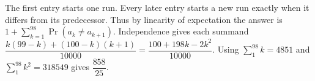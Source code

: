 The first entry starts one run. Every later entry starts a new run exactly when it differs from its predecessor. Thus by linearity of expectation the answer is $1+\sum_{k=1}^{98}\Pr(a_k\ne a_{k+1})$. Independence gives each summand $\dfrac{k(99-k)+(100-k)(k+1)}{10000}=\dfrac{100+198k-2k^2}{10000}$. Using $\sum_{1}^{98}k=4851$ and $\sum_{1}^{98}k^2=318549$ gives $\boxed{\dfrac{858}{25}}$.
